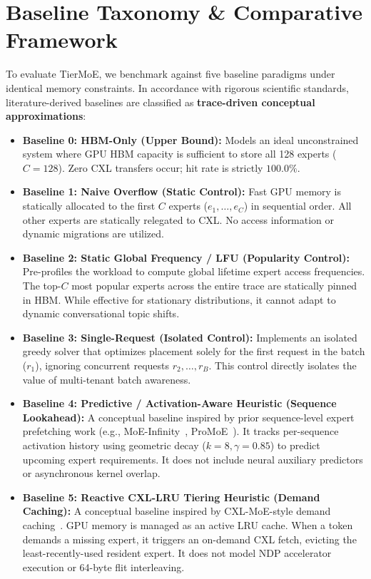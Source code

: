\documentclass[10pt,journal,compsoc]{IEEEtran}
\begin{document}
\section{Baseline Taxonomy \& Comparative Framework}
\label{sec:baselines}

To evaluate TierMoE, we benchmark against five baseline paradigms under identical memory constraints. In accordance with rigorous scientific standards, literature-derived baselines are classified as \textbf{trace-driven conceptual approximations}:

\begin{itemize}
    \item \textbf{Baseline 0: HBM-Only (Upper Bound):} Models an ideal unconstrained system where GPU HBM capacity is sufficient to store all 128 experts ($C=128$). Zero CXL transfers occur; hit rate is strictly $100.0\%$.
    \item \textbf{Baseline 1: Naive Overflow (Static Control):} Fast GPU memory is statically allocated to the first $C$ experts ($e_1, \dots, e_C$) in sequential order. All other experts are statically relegated to CXL. No access information or dynamic migrations are utilized.
    \item \textbf{Baseline 2: Static Global Frequency / LFU (Popularity Control):} Pre-profiles the workload to compute global lifetime expert access frequencies. The top-$C$ most popular experts across the entire trace are statically pinned in HBM. While effective for stationary distributions, it cannot adapt to dynamic conversational topic shifts.
    \item \textbf{Baseline 3: Single-Request (Isolated Control):} Implements an isolated greedy solver that optimizes placement solely for the first request in the batch ($r_1$), ignoring concurrent requests $r_2, \dots, r_B$. This control directly isolates the value of multi-tenant batch awareness.
    \item \textbf{Baseline 4: Predictive / Activation-Aware Heuristic (Sequence Lookahead):} A conceptual baseline inspired by prior sequence-level expert prefetching work (e.g., MoE-Infinity~\cite{fu2024moeinfinity}, ProMoE~\cite{promoe2025}). It tracks per-sequence activation history using geometric decay ($k=8, \gamma=0.85$) to predict upcoming expert requirements. It does not include neural auxiliary predictors or asynchronous kernel overlap.
    \item \textbf{Baseline 5: Reactive CXL-LRU Tiering Heuristic (Demand Caching):} A conceptual baseline inspired by CXL-MoE-style demand caching~\cite{cxlmoe2023}. GPU memory is managed as an active LRU cache. When a token demands a missing expert, it triggers an on-demand CXL fetch, evicting the least-recently-used resident expert. It does not model NDP accelerator execution or 64-byte flit interleaving.
\end{itemize}
\end{document}

